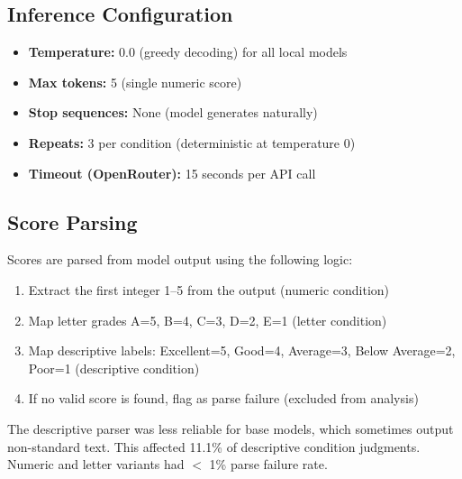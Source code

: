 \subsection{Inference Configuration}

\begin{itemize}
    \item \textbf{Temperature:} 0.0 (greedy decoding) for all local models
    \item \textbf{Max tokens:} 5 (single numeric score)
    \item \textbf{Stop sequences:} None (model generates naturally)
    \item \textbf{Repeats:} 3 per condition (deterministic at temperature 0)
    \item \textbf{Timeout (OpenRouter):} 15 seconds per API call
\end{itemize}

\subsection{Score Parsing}

Scores are parsed from model output using the following logic:

\begin{enumerate}
    \item Extract the first integer 1--5 from the output (numeric condition)
    \item Map letter grades A=5, B=4, C=3, D=2, E=1 (letter condition)
    \item Map descriptive labels: Excellent=5, Good=4, Average=3, Below Average=2, Poor=1 (descriptive condition)
    \item If no valid score is found, flag as parse failure (excluded from analysis)
\end{enumerate}

The descriptive parser was less reliable for base models, which sometimes output non-standard text. This affected 11.1\% of descriptive condition judgments. Numeric and letter variants had $<$ 1\% parse failure rate.
